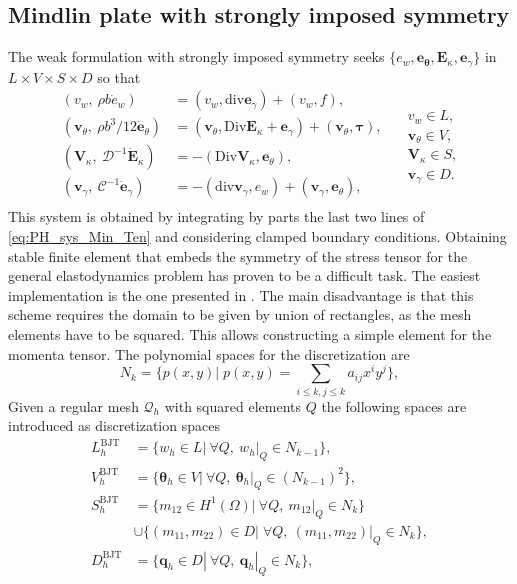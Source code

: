 \documentclass{ifacconf}
\begin{document}
\subsection{Mindlin plate with strongly imposed symmetry}

The weak formulation with strongly imposed symmetry seeks $\{e_w, \bm{e}_{\bm{\theta}}, \bm{E}_{\kappa}, \bm{e}_{\gamma}\}$ in $L \times V \times S \times D$ so that 
\begin{equation}
\label{eq:weak_min_PH_strong}
\begin{aligned}
(v_w, \ \rho b \dot{e}_w) &= (v_w, \mathrm{div} \bm{e}_\gamma) + (v_w, f), \\ 
(\bm{v}_\theta, \ \rho b^3/12  \dot{\bm{e}}_\theta) &= (\bm{v}_\theta, \mathrm{Div} \bm{E}_\kappa + \bm{e}_\gamma) + (\bm{v}_\theta, \bm{\tau}), \\  
(\bm{V}_\kappa, \ \mathcal{D}^{-1} \dot{\bm{E}}_\kappa) &= -(\mathrm{Div} \bm{V}_\kappa,  \bm{e}_\theta), \\ 
(\bm{v}_\gamma, \ \mathcal{C}^{-1} \dot{\bm{e}}_\gamma) &= -(\mathrm{div} \bm{v}_\gamma, e_w ) + (\bm{v}_\gamma, \bm{e}_{\theta}), \\ 
\end{aligned} \quad
\begin{aligned}
v_w \in L, \\
\bm{v}_\theta \in V, \\
\bm{V}_\kappa \in S, \\
\bm{v}_\gamma \in D.
\end{aligned}
\end{equation}
This system is obtained by integrating by parts the last two lines of \eqref{eq:PH_sys_Min_Ten} and considering clamped boundary conditions. Obtaining stable finite element that embeds the symmetry of the stress tensor for the general elastodynamics problem has proven to be a difficult task. The easiest implementation is the one presented in \cite{becacheWave,becacheElas}. The main disadvantage is that this scheme requires the domain to be given by union of rectangles, as the mesh elements have to be squared. This allows constructing a simple element for the momenta tensor. The polynomial spaces for the discretization are
\[
N_{k} = \{p(x, y)| \; p(x, y) = \sum_{i\le k, j\le k} a_{ij} x^i y^j  \},
\]
Given a regular mesh $\mathcal{Q}_h$ with squared elements $Q$ the following spaces are introduced as discretization spaces
\begin{equation}
\label{eq:BTJ}
	\begin{aligned}
	L_h^{\text{BJT}} &= \{w_h \in L | \ \forall Q, \ w_h|_{Q} \in N_{k-1} \}, \\
	V_h^{\text{BJT}} &= \{\bm{\theta}_h \in V | \ \forall Q,\ \bm{\theta}_h|_{Q} \in (N_{k-1})^2 \}, \\
	S_h^{\text{BJT}} &= \{m_{12} \in H^1(\Omega)| \ \forall Q,\ m_{12}|_{Q} \in N_{k} \}  \\
	&\cup \{(m_{11}, m_{22}) \in D| \; \forall Q,\ (m_{11}, m_{22})|_{Q} \in N_{k} \}, \\
	D_h^{\text{BJT}} &= \{\bm{q}_h \in D | \ \forall Q,\ \bm{q}_h|_{Q} \in N_{k} \}, \\ 
	\end{aligned}
\end{equation}
\end{document}
